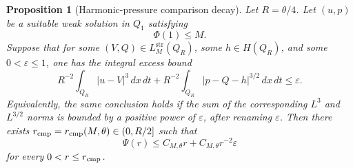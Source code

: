 \documentclass[11pt]{article}
\numberwithin{equation}{section}
\theoremstyle{plain}
\newtheorem{proposition}{Proposition}[section]
\theoremstyle{definition}
\theoremstyle{remark}
\newcommand{\str}{\mathrm{str}}
\begin{document}
\begin{proposition}[Harmonic-pressure comparison decay]
\label{pII:prop:harmonic-pressure-comparison-decay}
Let $R=\theta/4$.  Let $(u,p)$ be a suitable weak solution in $Q_1$ satisfying
\[
        \Phi(1)\le M.
\]
Suppose that for some $(V,Q)\in L_M^{\str}(Q_R)$, some $h\in H(Q_R)$, and some $0<\varepsilon\le1$, one has the integral excess bound
\[
        R^{-2}\int_{Q_R}|u-V|^3\,dx\,dt
        +
        R^{-2}\int_{Q_R}|p-Q-h|^{3/2}\,dx\,dt
        \le
        \varepsilon .
\]
Equivalently, the same conclusion holds if the sum of the corresponding $L^3$ and $L^{3/2}$ norms is bounded by a positive power of \(\varepsilon\), after renaming \(\varepsilon\).  Then there exists $r_{\rm cmp}=r_{\rm cmp}(M,\theta)\in(0,R/2]$ such that
\[
        \Psi(r)
        \le
        C_{M,\theta}r
        +
        C_{M,\theta}r^{-2}\varepsilon
\]
for every $0<r\le r_{\rm cmp}$.
\end{proposition}
\end{document}
